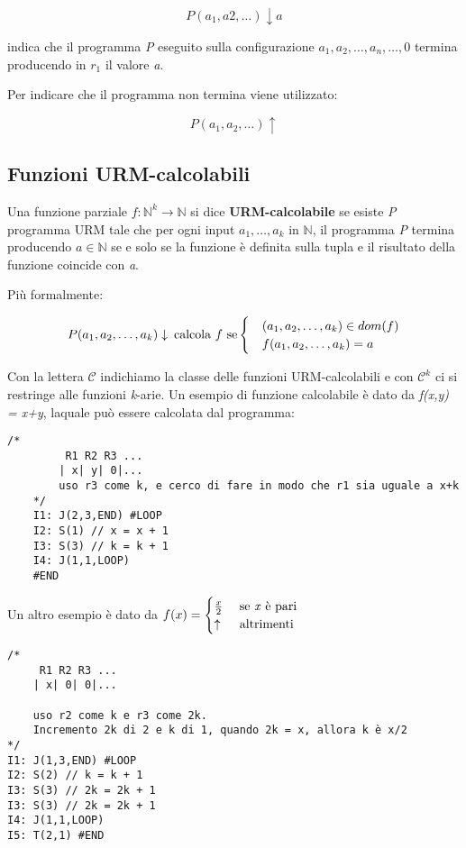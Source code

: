 $$
P(a_1, a2, \ldots) \downarrow a
$$

indica che il programma \emph{P} eseguito sulla configurazione $a_1, a_2, \ldots, a_n, \ldots, 0$ termina producendo in $r_1$ il valore \emph{a}.

Per indicare che il programma non termina viene utilizzato:

$$
P(a_1, a_2, \ldots)\uparrow
$$

\subsection{Funzioni URM-calcolabili}\label{funzioni-urm-calcolabili}

Una funzione parziale $f: \mathbb{N}^k \rightarrow \mathbb{N}$ si dice \textbf{URM-calcolabile} se esiste \emph{P} programma URM tale che per ogni input $a_1, \ldots, a_k$ in $\mathbb{N}$, il programma \emph{P} termina producendo $a \in \mathbb{N}$ se e solo se la funzione è definita sulla tupla e il risultato della funzione coincide con \emph{a}.

Più formalmente:

$$
P(a_1, a_2, \ldots, a_k)\downarrow \: \text{calcola $ f $ se}
\begin{cases}
&(a_1, a_2, \ldots, a_k) \in dom(f) \\
&f(a_1, a_2, \ldots, a_k) = a
\end{cases}
$$


Con la lettera $\mathcal{C}$ indichiamo la classe delle funzioni URM-calcolabili e con $\mathcal{C}^k$ ci si restringe alle funzioni \emph{k}-arie.
Un esempio di funzione calcolabile è dato da \emph{f(x,y) = x+y}, laquale può essere calcolata dal programma:

\begin{lstlisting}[language=URM]
	/*
		 R1 R2 R3 ...
		| x| y| 0|...
		uso r3 come k, e cerco di fare in modo che r1 sia uguale a x+k
	*/
	I1: J(2,3,END) #LOOP
	I2: S(1) // x = x + 1
	I3: S(3) // k = k + 1 
	I4: J(1,1,LOOP)
	#END
\end{lstlisting}

Un altro esempio è dato da $ f(x) = \begin{cases}
\frac{x}{2} &\text{ se \textit{x} è pari} \\
\uparrow &\text{ altrimenti}
\end{cases}$

\begin{lstlisting}[language=URM]
 /*
	 R1 R2 R3 ...
	| x| 0| 0|...
	
	uso r2 come k e r3 come 2k.
	Incremento 2k di 2 e k di 1, quando 2k = x, allora k è x/2
*/
I1: J(1,3,END) #LOOP
I2: S(2) // k = k + 1
I3: S(3) // 2k = 2k + 1 
I3: S(3) // 2k = 2k + 1 
I4: J(1,1,LOOP)
I5: T(2,1) #END
\end{lstlisting}

